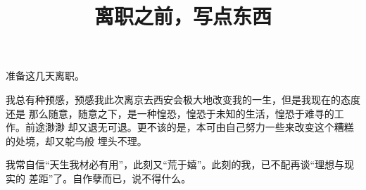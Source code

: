 \documentclass[cn,pad]{elegantbook}
\title{离职之前，写点东西}
\begin{document}
	准备这几天离职。
	
	我总有种预感，预感我此次离京去西安会极大地改变我的一生，但是我现在的态度还是
	那么随意，随意之下，是一种惶恐，惶恐于未知的生活，惶恐于难寻的工作。前途渺渺
	却又退无可退。更不该的是，本可由自己努力一些来改变这个糟糕的处境，却又鸵鸟般
	埋头不理。
	
	我常自信“天生我材必有用”，此刻又“荒于嬉”。此刻的我，已不配再谈“理想与现实的
	差距”了。自作孽而已，说不得什么。
	
	
\end{document}
